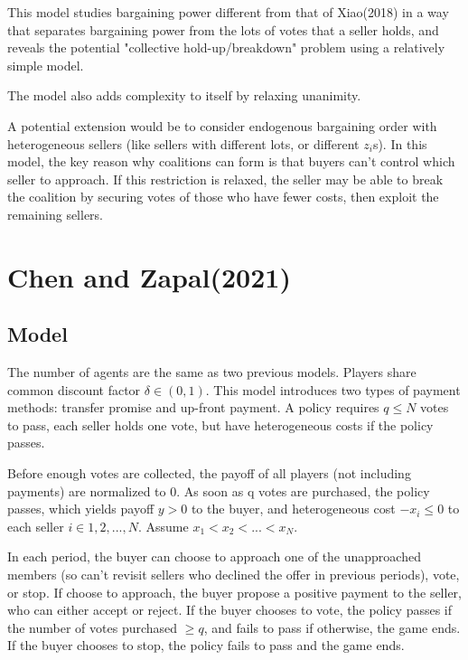 \documentclass[ProjectGAZ]{subfiles}
\begin{document}
This model studies bargaining power different from that of Xiao(2018) in a way that separates bargaining power from the lots of votes that a seller holds, and reveals the potential "collective hold-up/breakdown" problem using a relatively simple model. 

The model also adds complexity to itself by relaxing unanimity.

A potential extension would be to consider endogenous bargaining order with heterogeneous sellers (like sellers with different lots, or different $z_i$s). In this model, the key reason why coalitions can form is that buyers can't control which seller to approach. If this restriction is relaxed, the seller may be able to break the coalition by securing votes of those who have fewer costs, then exploit the remaining sellers.


\section{Chen and Zapal(2021)}\label{subsec:CnZ}

\subsection{Model}\label{subsec:CnZ-model}

The number of agents are the same as two previous models. Players share common discount factor $\delta \in (0, 1)$. This model introduces two types of payment methods: transfer promise and up-front payment. A policy requires $q \leq N$ votes to pass, each seller holds one vote, but have heterogeneous costs if the policy passes.

Before enough votes are collected, the payoff of all players (not including payments) are normalized to 0. As soon as q votes are purchased, the policy passes, which yields payoff $y > 0$ to the buyer, and heterogeneous cost $-x_i \leq 0$ to each seller $i \in {1, 2, ..., N}$. Assume $x_1 < x_2 < ... <x_N$.
 
In each period, the buyer can choose to approach one of the unapproached members (so can't revisit sellers who declined the offer in previous periods), vote, or stop. If choose to approach, the buyer propose a positive payment to the seller, who can either accept or reject. If the buyer chooses to vote, the policy passes if the number of votes purchased $\geq q$, and fails to pass if otherwise, the game ends. If the buyer chooses to stop, the policy fails to pass and the game ends.
\end{document}
